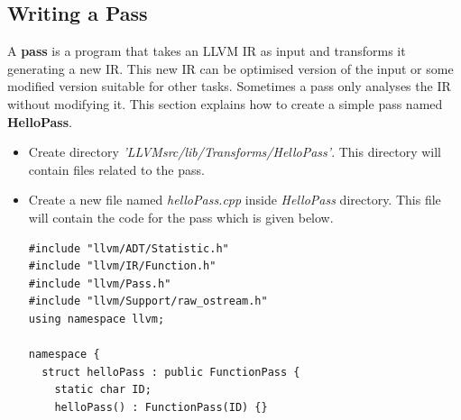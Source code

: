 \subsection{Writing a Pass}
\label{subsec:WritingAPass}
A \textbf{pass} is a program that takes an LLVM IR as input and transforms it
generating a new IR. This new IR can be optimised version of the input or some 
modified version suitable for other tasks. Sometimes a pass only analyses 
the IR without modifying it.
\bigbreak \noindent This section explains how to create a simple pass named \textbf{HelloPass}.
\begin{itemize} \tightlist
    \item Create directory \textit{'LLVMsrc/lib/Transforms/HelloPass'}. This directory will contain files related to the pass.
    \item Create a new file named \textit{helloPass.cpp} inside \textit{HelloPass} directory. This file will contain the code for the pass which is given below.
        \begin{lstlisting}
#include "llvm/ADT/Statistic.h"
#include "llvm/IR/Function.h"
#include "llvm/Pass.h"
#include "llvm/Support/raw_ostream.h"
using namespace llvm;

namespace {
  struct helloPass : public FunctionPass {
    static char ID;
    helloPass() : FunctionPass(ID) {}


\end{lstlisting}
\end{itemize}
